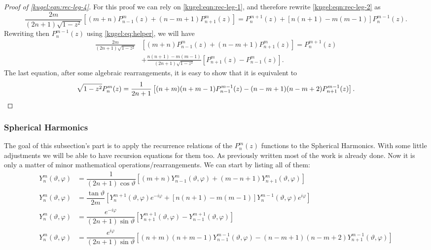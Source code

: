 \begin{proof}[Proof of \eqref{kugel:eqn:rec-leg-4}]
  For this proof we can rely on \eqref{kugel:eqn:rec-leg-1}, and therefore
  rewrite \eqref{kugel:eqn:rec-leg-2} as 
  \begin{equation*}
    \frac{2m}{(2n+1)\sqrt{1-z^2}} \left[
      (m+n)P^m_{n-1}(z) + (n-m+1)P^m_{n+1}(z)
    \right] = P^{m+1}_n(z) + [ n(n+1)-m(m-1) ]P^{m-1}_n(z).
  \end{equation*}
  Rewriting then $P^{m-1}_n(z)$ using \eqref{kugel:eq:helper}, we will have
  \begin{align*}
    \frac{2m}{(2n+1)\sqrt{1-z^2}}
      &\left[ (m+n)P^m_{n-1}(z) + (n-m+1)P^m_{n+1}(z) \right] = P^{m+1}_n(z) \\
      &+ \frac{n(n+1)-m(m-1)}{(2n+1)\sqrt{1-z^2}} \left[
          P^m_{n+1}(z)-P^m_{n-1}(z)
        \right].
  \end{align*}
  The last equation, after some algebraic rearrangements, it is easy to show
  that it is equivalent to
  \begin{equation*}
    \sqrt{1-z^2} P^m_n(z) = \dfrac{1}{2n+1} \left[
      (n+m)(n+m-1)P^{m-1}_{n-1}(z) - (n-m+1)(n-m+2)P^{m-1}_{n+1}(z)
    \right].
    \qedhere
  \end{equation*}
\end{proof}

\subsubsection{Spherical Harmonics}

The goal of this subsection's part is to apply the recurrence relations of the
$P^m_n(z)$ functions to the Spherical Harmonics.  With some little adjustments
we will be able to have recursion equations for them too. As previously written
most of the work is already done. Now it is only a matter of minor mathematical
operations/rearrangements. We can start by listing all of them:
\begin{subequations}
  \begin{align}
  Y^m_n(\vartheta, \varphi) &= \dfrac{1}{(2n+1)\cos \vartheta} \left[
      (m+n)Y^m_{n-1}(\vartheta, \varphi)
      + (m-n+1)Y^m_{n+1}(\vartheta, \varphi)
    \right] \label{kugel:eqn:rec-sph-harm-1} \\
  Y^m_n(\vartheta, \varphi) &= \dfrac{\tan \vartheta}{2m}\left[
      Y^{m+1}_n(\vartheta, \varphi)e^{-i\varphi}
      + [n(n+1)-m(m-1)]Y^{m-1}_n(\vartheta, \varphi)e^{i\varphi}
    \right] \label{kugel:eqn:rec-sph-harm-2} \\
  Y^m_n(\vartheta, \varphi) &= \dfrac{e^{-i\varphi}}{ (2n+1)\sin \vartheta}
    \left[
      Y^{m+1}_{n+1}(\vartheta, \varphi)
      - Y^{m+1}_{n-1}(\vartheta, \varphi)
    \right] \label{kugel:eqn:rec-sph-harm-3} \\
  Y^m_n(\vartheta, \varphi) &= \dfrac{e^{i\varphi}}{(2n+1)\sin \vartheta}
    \left[
      (n+m)(n+m-1)Y^{m-1}_{n-1}(\vartheta, \varphi)
      - (n-m+1)(n-m+2)Y^{m-1}_{n+1}(\vartheta, \varphi)
    \right] \label{kugel:eqn:rec-sph-harm-4} 
  \end{align}
\end{subequations}

